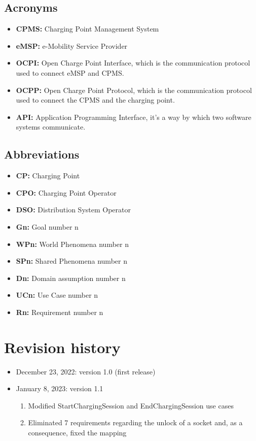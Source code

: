 \documentclass{Configuration_Files/PoliMi3i_thesis}
\begin{document}
\subsection{Acronyms}

\begin{itemize}
    \item \textbf{CPMS:} Charging Point Management System
    \item \textbf{eMSP:} e-Mobility Service Provider
    \item \textbf{OCPI:} Open Charge Point Interface, which is the communication protocol used to connect eMSP and CPMS.
    \item \textbf{OCPP:} Open Charge Point Protocol, which is the communication protocol used to connect the CPMS and the charging point.
    \item \textbf{API:} Application Programming Interface, it's a way by which two software systems communicate.
\end{itemize}

\subsection{Abbreviations}

\begin{itemize}
    \item \textbf{CP:} Charging Point
    \item \textbf{CPO:} Charging Point Operator
    \item \textbf{DSO:} Distribution System Operator
    \item \textbf{Gn:} Goal number n
    \item \textbf{WPn:} World Phenomena number n
    \item \textbf{SPn:} Shared Phenomena number n
    \item \textbf{Dn:} Domain assumption number n
    \item \textbf{UCn:} Use Case number n
    \item \textbf{Rn:} Requirement number n
    
\end{itemize}

\section{Revision history}

\begin{itemize}
    \item December 23, 2022: version 1.0 (first release)
    \item January 8, 2023: version 1.1
        \begin{enumerate}
            \item Modified StartChargingSession and EndChargingSession use cases
            \item Eliminated 7 requirements regarding the unlock of a socket and, as a consequence, fixed the mapping
        \end{enumerate}
\end{itemize}
\end{document}
